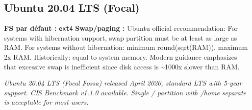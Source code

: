 \documentclass[10pt,a4paper]{article}
\begin{document}
\subsection{Ubuntu 20.04 LTS (Focal)}
\noindent\small \textbf{FS par d\'efaut :} \texttt{ext4} \quad\textbullet\quad \textbf{Swap/paging :} Ubuntu official recommendation: For systems with hibernation support, swap partition must be at least as large as RAM. For systems without hibernation: minimum round(sqrt(RAM)), maximum 2x RAM. Historically: equal to system memory. Modern guidance emphasizes that excessive swap is inefficient since disk access is \textasciitilde{}1000x slower than RAM.\normalsize\par\smallskip
\noindent\small\textit{Ubuntu 20.04 LTS (Focal Fossa) released April 2020, standard LTS with 5-year support. CIS Benchmark v1.1.0 available. Single / partition with /home separate is acceptable for most users.}\normalsize\par\smallskip
\end{document}
